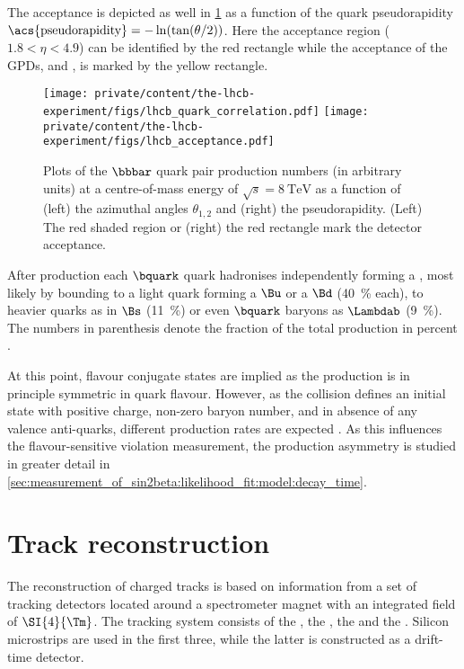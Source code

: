 The acceptance is depicted as well in
\cref{fig:lhcb_experiment:detector:production} as a function of the quark
\acl{pseudorapidity} $\text{\acs{pseudorapidity}} = -\ln(\tan(\theta/2))$. Here
the \LHCb acceptance region ($\num{1.8} < \eta < \num{4.9}$) can be identified
by the red rectangle while the acceptance of the \acfp{GPD}, \ATLAS and \CMS, is
marked by the yellow rectangle.
%
\begin{figure}[t]
  \centering
    \texttt{[image: private/content/the-lhcb-experiment/figs/lhcb\_quark\_correlation.pdf]}
    \texttt{[image: private/content/the-lhcb-experiment/figs/lhcb\_acceptance.pdf]}
  \caption{
    Plots of the $\bbbar$ quark pair production numbers (in arbitrary units) at
  a centre-of-mass energy of $\sqrt{s} = \SI{8}{\TeV}$ as a function of (left)
  the azimuthal angles $\theta_{1,2}$ and (right) the \acf{pseudorapidity}.
  (Left) The red shaded region or (right) the red rectangle mark the \LHCb
  detector acceptance. \cite{lhcb:quarkproduction}}
  \label{fig:lhcb_experiment:detector:production}
\end{figure}

After production each $\bquark$ quark hadronises independently forming a
\bhadron, most likely by bounding to a light quark forming a $\Bu$ or a $\Bd$
(\SI{40}{\percent} each), to heavier quarks as in $\Bs$ (\SI{11}{\percent}) or
even $\bquark$ baryons as $\Lambdab$ (\SI{9}{\percent}). The numbers in
parenthesis denote the fraction of the total production in percent
\cite{Agashe:2014kda}. 

At this point, flavour conjugate states are implied as the production is in
principle symmetric in quark flavour. However, as the
\protonproton collision defines an initial state with positive charge, non-zero
baryon number, and in absence of any valence anti-quarks, different production
rates are expected
\cite{Chaichian:1993rh,Norrbin:2000zc,Norrbin:2000jy}. As this influences the
flavour-sensitive \CP violation measurement, the production asymmetry is studied
in greater detail in
\cref{sec:measurement_of_sin2beta:likelihood_fit:model:decay_time}.

\section{Track reconstruction}
\label{sec:lhcb_experiment:tracking}

The reconstruction of charged tracks is based on information from a set of
tracking detectors located around a spectrometer magnet with an integrated field
of $\SI{4}{\Tm}$. The tracking system consists of the \VELO, the \TT, the
\IT and the \OT. Silicon microstrips are used in the first three, while the
latter is constructed as a drift-time detector.

